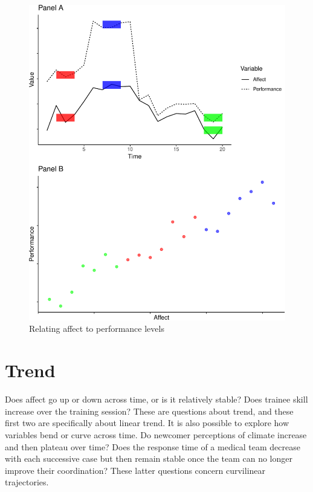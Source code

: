 \documentclass[english,,man]{apa6}
\theoremstyle{definition}
\theoremstyle{definition}
\theoremstyle{definition}
\theoremstyle{remark}
\begin{document}
\begin{figure}
\centering
\includegraphics{figures/unnamed-chunk-10-1.pdf}
\caption{\label{fig:unnamed-chunk-10}Relating affect to performance
levels\label{level_relation}}
\end{figure}

\hypertarget{trend}{%
\section{Trend}\label{trend}}

Does affect go up or down across time, or is it relatively stable? Does
trainee skill increase over the training session? These are questions
about trend, and these first two are specifically about linear trend. It
is also possible to explore how variables bend or curve across time. Do
newcomer perceptions of climate increase and then plateau over time?
Does the response time of a medical team decrease with each successive
case but then remain stable once the team can no longer improve their
coordination? These latter questions concern curvilinear trajectories.
\end{document}
